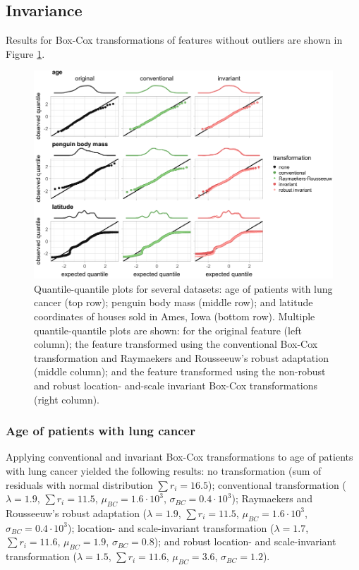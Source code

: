 \documentclass[preprint,12pt,authoryear]{elsarticle}
\begin{document}
\subsection{Invariance}\label{sec-app:invariance}

Results for Box-Cox transformations of features without outliers are
shown in Figure \ref{fig:experimental-results-invariance-appendix}.

\begin{figure}

{\centering \includegraphics[width=1\linewidth]{figure_appendix_2} 

}

\caption{Quantile-quantile plots for several datasets: age of patients with lung cancer (top row); penguin body mass (middle row); and latitude coordinates of houses sold in Ames, Iowa (bottom row). Multiple quantile-quantile plots are shown: for the original feature (left column); the feature transformed using the conventional Box-Cox transformation and Raymaekers and Rousseeuw's robust adaptation (middle column); and the feature transformed using the non-robust and robust location- and-scale invariant Box-Cox transformations (right column).}\label{fig:experimental-results-invariance-appendix}
\end{figure}

\subsubsection{Age of patients with lung
cancer}\label{sec-app:age-of-patients-with-lung-cancer}

Applying conventional and invariant Box-Cox transformations to age of
patients with lung cancer \citep{Loprinzi1994-cd} yielded the following
results: no transformation (sum of residuals with normal distribution
\(\sum r_i = 16.5\)); conventional transformation (\(\lambda = 1.9\),
\(\sum r_i = 11.5\), \(\mu_{BC} = 1.6 \cdot 10^3\),
\(\sigma_{BC} = 0.4 \cdot 10^3\)); Raymaekers and Rousseeuw's robust
adaptation (\(\lambda = 1.9\), \(\sum r_i = 11.5\),
\(\mu_{BC} = 1.6 \cdot 10^3\), \(\sigma_{BC} = 0.4 \cdot 10^3\));
location- and scale-invariant transformation (\(\lambda = 1.7\),
\(\sum r_i = 11.6\), \(\mu_{BC} = 1.9\), \(\sigma_{BC} = 0.8\)); and
robust location- and scale-invariant transformation (\(\lambda = 1.5\),
\(\sum r_i = 11.6\), \(\mu_{BC} = 3.6\), \(\sigma_{BC} = 1.2\)).
\end{document}
